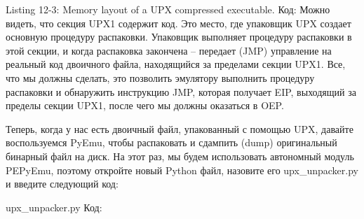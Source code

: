 \documentclass[12pt, a4paper, oneside]{book}
\begin{document}
Listing 12-3: Memory layout of a UPX compressed executable.
Код:
Можно видеть, что секция UPX1 содержит код. Это место, где упаковщик UPX создает основную процедуру распаковки. Упаковщик выполняет процедуру распаковки в этой секции, и когда распаковка закончена – передает (JMP) управление на реальный код двоичного файла, находящийся за пределами секции UPX1. Все, что мы должны сделать, это позволить эмулятору выполнить процедуру распаковки и обнаружить инструкцию JMP, которая получает EIP, выходящий за пределы секции UPX1, после чего мы должны оказаться в OEP.

Теперь, когда у нас есть двоичный файл, упакованный с помощью UPX, давайте воспользуемся PyEmu, чтобы распаковать и сдампить (dump) оригинальный бинарный файл на диск. На этот раз, мы будем использовать автономный модуль PEPyEmu, поэтому откройте новый Python файл, назовите его upx\_unpacker.py и введите следующий код:

upx\_unpacker.py
Код:







\end{document}
